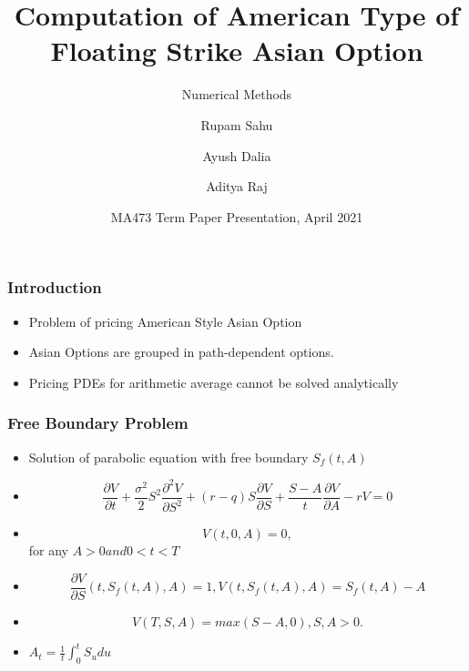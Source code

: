 \documentclass{beamer}
\title[MA-473 Term Paper] %
{Computation of American Type of Floating Strike Asian Option}
\subtitle{Numerical Methods}
\author[Rupam Sahu, Ayush Dalia, Aditya Raj] %
{Rupam Sahu\inst{1} \and Ayush Dalia\inst{2} \and Aditya Raj\inst{3}}
\date[14 April 2021] %
{MA473 Term Paper Presentation, April 2021}
\begin{document}
\frame{\titlepage}
\begin{frame}
\frametitle{Introduction}
    \begin{itemize}
        \item Problem of pricing American Style Asian Option
        \item Asian Options are grouped in path-dependent options.
        \item Pricing PDEs for arithmetic average cannot be solved analytically
    \end{itemize}
\end{frame}
\begin{frame}
\frametitle{Free Boundary Problem}
    \begin{itemize}
        \item Solution of parabolic equation with free boundary $S_{f}(t,A)$
        \item \begin{equation}\frac{\partial V}{\partial t} + \frac{\sigma^{2}}{2}S^{2}\frac{\partial^{2} V}{\partial S^{2}} + (r-q)S\frac{\partial V}{\partial S} + \frac{S-A}{t}\frac{\partial V}{\partial A} - rV = 0
        \end{equation}
        \item 
           \begin{equation}
               V(t,0,A) = 0,  
           \end{equation} for any $A>0 and 0<t<T$
         \item
            \begin{equation}
                \frac{\partial V}{\partial S}(t, S_{f}(t,A),A) = 1, V(t,S_{f}(t,A),A) = S_{f}(t,A) - A
            \end{equation}
        \item
            \begin{equation}
                V(T,S,A) = max(S-A,0), S,A > 0.
            \end{equation}
        \item $A_{t} = \frac{1}{t}\int_{0}^{t}S_{u}du$ 
    \end{itemize}
\end{frame}
\end{document}
